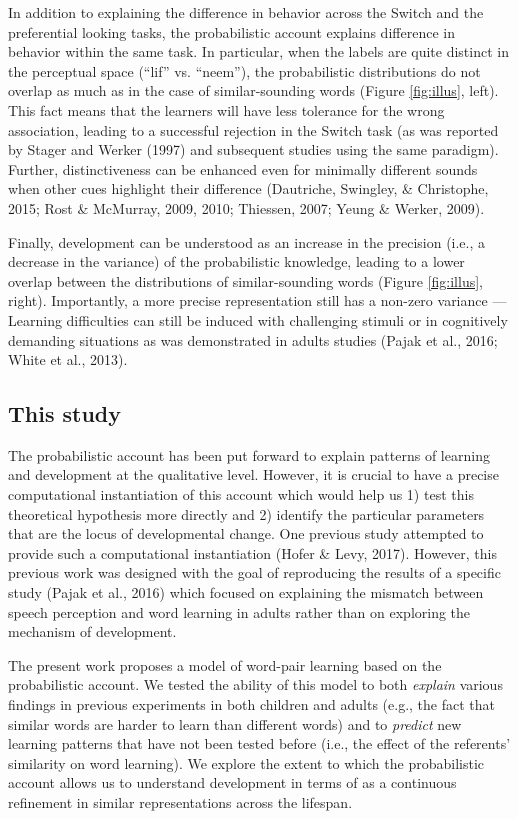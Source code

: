 \documentclass[english,,man,floatsintext]{apa6}
\theoremstyle{definition}
\theoremstyle{definition}
\theoremstyle{definition}
\theoremstyle{remark}
\begin{document}
In addition to explaining the difference in behavior across the Switch
and the preferential looking tasks, the probabilistic account explains
difference in behavior within the same task. In particular, when the
labels are quite distinct in the perceptual space (\enquote{lif} vs.
\enquote{neem}), the probabilistic distributions do not overlap as much
as in the case of similar-sounding words (Figure \ref{fig:illus}, left).
This fact means that the learners will have less tolerance for the wrong
association, leading to a successful rejection in the Switch task (as
was reported by Stager and Werker (1997) and subsequent studies using
the same paradigm). Further, distinctiveness can be enhanced even for
minimally different sounds when other cues highlight their difference
(Dautriche, Swingley, \& Christophe, 2015; Rost \& McMurray, 2009, 2010;
Thiessen, 2007; Yeung \& Werker, 2009).

Finally, development can be understood as an increase in the precision
(i.e., a decrease in the variance) of the probabilistic knowledge,
leading to a lower overlap between the distributions of similar-sounding
words (Figure \ref{fig:illus}, right). Importantly, a more precise
representation still has a non-zero variance --- Learning difficulties
can still be induced with challenging stimuli or in cognitively
demanding situations as was demonstrated in adults studies (Pajak et
al., 2016; White et al., 2013).

\subsection{This study}\label{this-study}

The probabilistic account has been put forward to explain patterns of
learning and development at the qualitative level. However, it is
crucial to have a precise computational instantiation of this account
which would help us 1) test this theoretical hypothesis more directly
and 2) identify the particular parameters that are the locus of
developmental change. One previous study attempted to provide such a
computational instantiation (Hofer \& Levy, 2017). However, this
previous work was designed with the goal of reproducing the results of a
specific study (Pajak et al., 2016) which focused on explaining the
mismatch between speech perception and word learning in adults rather
than on exploring the mechanism of development.

The present work proposes a model of word-pair learning based on the
probabilistic account. We tested the ability of this model to both
\emph{explain} various findings in previous experiments in both children
and adults (e.g., the fact that similar words are harder to learn than
different words) and to \emph{predict} new learning patterns that have
not been tested before (i.e., the effect of the referents' similarity on
word learning). We explore the extent to which the probabilistic account
allows us to understand development in terms of as a continuous
refinement in similar representations across the lifespan.
\end{document}
